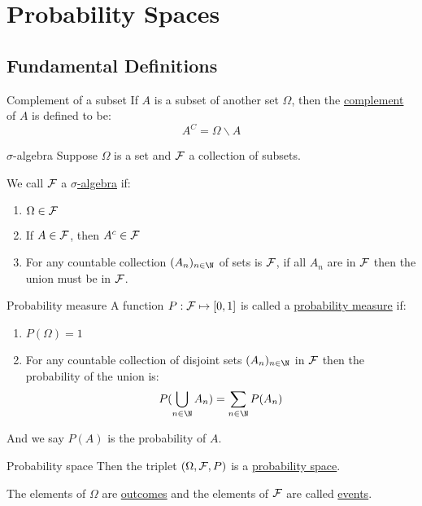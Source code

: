 \documentclass[../Main.tex]{subfiles}
\begin{document}
\section{Probability Spaces}
\subsection{Fundamental Definitions}
\begin{definition}{Complement of a subset}
    If $A$ is a subset of another set $\Omega$, then the \underline{complement} of $A$ is defined to be:
    \begin{equation*}
        A^C = \Omega \backslash A
    \end{equation*}
\end{definition}
\begin{definition}{$\sigma$-algebra}
    Suppose $\Omega$ is a set and $\mathcal{F}$ a collection of subsets.\par
    We call $\mathcal{F}$ a \underline{$\sigma$-algebra} if:
    \begin{enumerate}
        \item $\Omega \in \mathcal{F}$
        \item If $A \in \mathcal{F}$, then $A^c \in \mathcal{F}$
        \item For any countable collection $(A_n)_{n \in \N}$ of sets is $\mathcal{F}$, if all $A_n$ are in $\mathcal{F}$ then the union must be in $\mathcal{F}$.
    \end{enumerate}
\end{definition}
\begin{definition}{Probability measure}
    A function $P : \mathcal{F} \mapsto [0, 1]$ is called a \underline{probability measure} if:
    \begin{enumerate}
        \item $P(\Omega) = 1$
        \item For any countable collection of disjoint sets $(A_n)_{n \in \N}$ in $\mathcal{F}$ then the probability of the union is:
            \begin{equation*}
                P(\bigcup_{n \in \N} A_n) = \sum_{n \in \N} P(A_n)
            \end{equation*}
    \end{enumerate}
    And we say $P(A)$ is the probability of $A$.
\end{definition}
\begin{definition}{Probability space}
    Then the triplet $(\Omega, \mathcal{F}, P)$ is a \underline{probability space}.\par
    The elements of $\Omega$ are \underline{outcomes} and the elements of $\mathcal{F}$ are called \underline{events}.
\end{definition}
\end{document}
